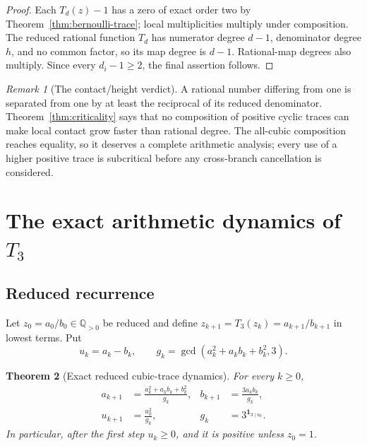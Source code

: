 \documentclass[11pt,oneside]{article}
\newtheorem{theorem}{Theorem}[section]
\theoremstyle{definition}
\theoremstyle{remark}
\newtheorem{remark}[theorem]{Remark}
\newcommand{\Q}{\mathbb Q}
\begin{document}
\begin{proof}
Each \(T_d(z)-1\) has a zero of exact order two by
Theorem~\ref{thm:bernoulli-trace}; local multiplicities multiply under composition.  The
reduced rational function \(T_d\) has numerator degree \(d-1\), denominator degree \(h\),
and no common factor, so its map degree is \(d-1\).  Rational-map degrees also multiply.
Since every \(d_i-1\ge2\), the final assertion follows.
\end{proof}

\begin{remark}[The contact/height verdict]
A rational number differing from one is separated from one by at least the reciprocal of its
reduced denominator.  Theorem~\ref{thm:criticality} says that no composition of positive
cyclic traces can make local contact grow faster than rational degree.  The all-cubic
composition reaches equality, so it deserves a complete arithmetic analysis; every use of a
higher positive trace is subcritical before any cross-branch cancellation is considered.
\end{remark}

\section{The exact arithmetic dynamics of \texorpdfstring{$T_3$}{T3}}
\label{sec:T3}

\subsection{Reduced recurrence}

Let \(z_0=a_0/b_0\in\Q_{>0}\) be reduced and define
\(z_{k+1}=T_3(z_k)=a_{k+1}/b_{k+1}\) in lowest terms.  Put
\begin{equation}
 u_k=a_k-b_k,
 \qquad
 g_k=\gcd(a_k^2+a_kb_k+b_k^2,3).
 \label{eq:T3-data}
\end{equation}

\begin{theorem}[Exact reduced cubic-trace dynamics]
\label{thm:T3-recurrence}
For every \(k\ge0\),
\begin{align}
 a_{k+1}&=\frac{a_k^2+a_kb_k+b_k^2}{g_k},
 &b_{k+1}&=\frac{3a_kb_k}{g_k},\label{eq:T3-ab-recurrence}\\
 u_{k+1}&=\frac{u_k^2}{g_k},
 &g_k&=3^{\mathbf1_{3\mid u_k}}.\label{eq:T3-u-recurrence}
\end{align}
In particular, after the first step \(u_k\ge0\), and it is positive unless \(z_0=1\).
\end{theorem}
\end{document}
